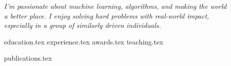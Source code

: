\documentclass[letterpaper,11pt]{article}
\begin{document}

\textit{I'm passionate about machine learning, algorithms, and making the world \\ a better place. I enjoy solving hard problems with real-world impact, \\ especially in a group of similarly driven individuals.}

{education.tex}
{experience.tex}
{awards.tex}
{teaching.tex}

\pagebreak

{publications.tex}
\end{document}
